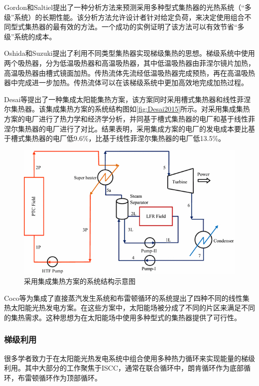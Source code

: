 Gordon和Saltiel提出了一种分析方法来预测采用多种型式集热器的光热系统（“多级”系统）的长期性能。该分析方法允许设计者针对给定负荷，来决定使用组合不同型式集热器的最有效的方法。一个成功的实例证明了该方法可以有效节省“多级”系统的成本。

Oshida和Suzuki\cite{Oshida1987}提出了利用不同类型集热器实现梯级集热的思想。梯级系统中使用两个吸热器，分为低温吸热器和高温吸热器，其中低温吸热器由菲涅尔镜片加热，高温吸热器由槽式镜面加热。传热流体先流经低温吸热器完成预热，再在高温吸热器中完成进一步加热。传热流体可以在该梯级系统中更加高效地完成加热过程。

Desai等\cite{Desai2015}提出了一种集成太阳能集热方案，该方案同时采用槽式集热器和线性菲涅尔集热器。该集成集热方案的系统结构图如\autoref{fig:Desai2015}所示。对采用集成集热方案的电厂进行了热力学和经济学分析，并同基于槽式集热器的电厂和基于线性菲涅尔集热器的电厂进行了对比。结果表明，采用集成方案的电厂的发电成本要比基于槽式集热器的电厂低9.6\%，比基于线性菲涅尔集热器的电厂低13.5\%。

\begin{figure}[!ht]
\centering
\includegraphics[width=.7\textwidth]{fig/Desai2015.jpg}
\caption{采用集成集热方案的系统结构示意图}\label{fig:Desai2015}
\end{figure}

Coco等\cite{Coco2015}为集成了直接蒸汽发生系统和布雷顿循环的系统提出了四种不同的线性集热太阳能光热发电方案。在这些方案中，太阳能场被分成了不同的片区来满足不同的集热需求。这种思想为在太阳能场中使用多种型式的集热器提供了可行性。

\subsubsection{梯级利用}

很多学者致力于在太阳能光热发电系统中组合使用多种热力循环来实现能量的梯级利用。其中大部分的工作聚焦于ISCC，通常在联合循环中，朗肯循环作为底部循环，布雷顿循环作为顶部循环。

